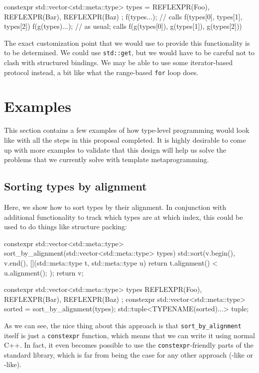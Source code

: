 \documentclass{wg21}
\newcommand{\cc}[1]{\texttt{#1}}
\begin{document}
\begin{cpp}
  constexpr std::vector<std::meta::type> types = {
    REFLEXPR(Foo), REFLEXPR(Bar), REFLEXPR(Baz)
  };
  f(types...); // calls f(types[0], types[1], types[2])
  f(g(types)...); // as usual; calls f(g(types[0]), g(types[1]), g(types[2]))
\end{cpp}

The exact customization point that we would use to provide this functionality
is to be determined. We could use \cc{std::get}, but we would have to be careful
not to clash with structured bindings. We may be able to use some iterator-based
protocol instead, a bit like what the range-based \cc{for} loop does.


\section{Examples}
This section contains a few examples of how type-level programming would look
like with all the steps in this proposal completed. It is highly desirable to
come up with more examples to validate that this design will help us solve the
problems that we currently solve with template metaprogramming.


\subsection{Sorting types by alignment}
Here, we show how to sort types by their alignment. In conjunction with additional
functionality to track which types are at which index, this could be used to do
things like structure packing:

\begin{cpp}
  constexpr std::vector<std::meta::type>
  sort_by_alignment(std::vector<std::meta::type> types) {
    std::sort(v.begin(), v.end(), [](std::meta::type t, std::meta::type u) {
      return t.alignment() < u.alignment();
    });
    return v;
  }

  constexpr std::vector<std::meta::type> types{
    REFLEXPR(Foo), REFLEXPR(Bar), REFLEXPR(Baz)
  };
  constexpr std::vector<std::meta::type> sorted = sort_by_alignment(types);
  std::tuple<TYPENAME(sorted)...> tuple;
\end{cpp}

As we can see, the nice thing about this approach is that \cc{sort_by_alignment}
itself is just a \cc{constexpr} function, which means that we can write it using
normal C++. In fact, it even becomes possible to use the \cc{constexpr}-friendly
parts of the standard library, which is far from being the case for any other
approach (\cite{Boost.Hana}-like or \cite{Boost.MPL}-like).
\end{document}
